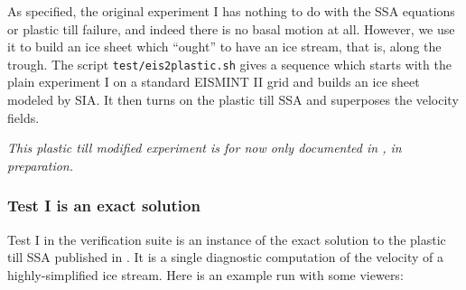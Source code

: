 \documentclass[11pt,final]{amsart}
\begin{document}
As specified, the original experiment I has nothing to do with the SSA equations or plastic till failure, and indeed there is no basal motion at all.  However, we use it to build an ice sheet which ``ought'' to have an ice stream, that is, along the trough.  The script \verb|test/eis2plastic.sh| gives a sequence which starts with the plain experiment I on a standard EISMINT II grid and builds an ice sheet modeled by SIA.  It then turns on the plastic till SSA and superposes the velocity fields.

\emph{This plastic till modified experiment is for now only documented in \cite{BuelerBrownSuper}, in preparation.}


\subsubsection*{Test I is an exact solution}  Test I in the verification suite is an instance of the exact solution to the plastic till SSA published in \cite{SchoofStream}.  It is a single diagnostic computation of the velocity of a highly-simplified ice stream.  Here is an example run with some viewers:
\end{document}
